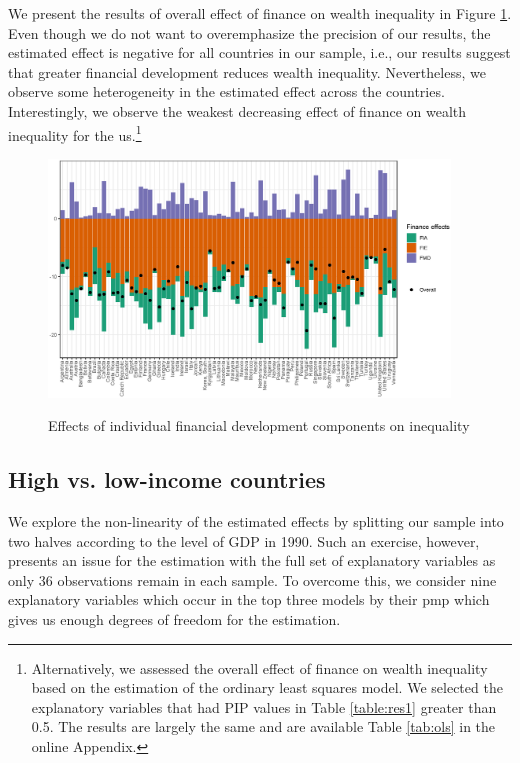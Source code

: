 \documentclass[a4paper,11pt]{article}
\begin{document}
We present the results of overall effect of finance on wealth inequality in Figure \ref{fig:finance_effect}. Even though we do not want to overemphasize the precision of our results, the estimated effect is negative for all countries in our sample, i.e., our results suggest that greater financial development reduces wealth inequality. Nevertheless, we observe some heterogeneity in the estimated effect across the countries. Interestingly, we observe the weakest decreasing effect of finance on wealth inequality for the \ac{us}.\footnote{Alternatively, we assessed the overall effect of finance on wealth inequality based on the estimation of the ordinary least squares model. We selected the explanatory variables that had PIP values in Table \ref{table:res1} greater than 0.5. The results are largely the same and are available Table \ref{tab:ols} in the online Appendix.}

\begin{figure}
\begin{center}
\caption{Effects of individual financial development components on inequality}
\includegraphics[width=0.95\textwidth]{figures/finance_effect.eps}
\label{fig:finance_effect}
\end{center}
\end{figure}

\subsection{High vs. low-income countries}
We explore the non-linearity of the estimated effects by splitting our sample into two halves according to the level of GDP in 1990. Such an exercise, however, presents an issue for the estimation with the full set of explanatory variables as only 36 observations remain in each sample. To overcome this, we consider nine explanatory variables which occur in the top three models by their \ac{pmp} which gives us enough degrees of freedom for the estimation. 
\end{document}
